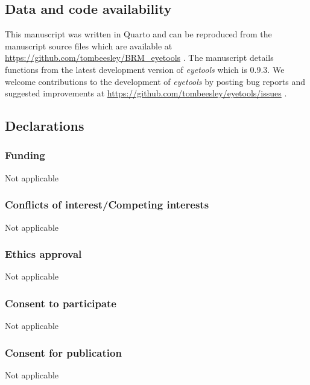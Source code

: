 \documentclass[
  man,
  floatsintext,
  longtable,
  nolmodern,
  notxfonts,
  notimes,
  colorlinks=true,linkcolor=blue,citecolor=blue,urlcolor=blue]{apa7}
\begin{document}
\subsection{Data and code
availability}\label{data-and-code-availability}

This manuscript was written in Quarto and can be reproduced from the
manuscript source files which are available at
\url{https://github.com/tombeesley/BRM_eyetools} . The manuscript
details functions from the latest development version of \emph{eyetools}
which is 0.9.3. We welcome contributions to the development of
\emph{eyetools} by posting bug reports and suggested improvements at
\url{https://github.com/tombeesley/eyetools/issues} .

\subsection{Declarations}\label{declarations}

\subsubsection{Funding}\label{funding}

Not applicable

\subsubsection{Conflicts of interest/Competing
interests}\label{conflicts-of-interestcompeting-interests}

Not applicable

\subsubsection{Ethics approval}\label{ethics-approval}

Not applicable

\subsubsection{Consent to participate}\label{consent-to-participate}

Not applicable

\subsubsection{Consent for publication}\label{consent-for-publication}

Not applicable
\end{document}
